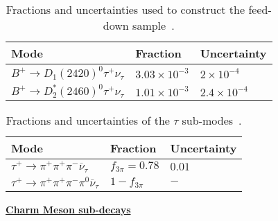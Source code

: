  
    
{
\renewcommand{\arraystretch}{1.25}
 \begin{table}
\centering
\scriptsize
\begin{tabular}{l | l | l }
Mode & Fraction & Uncertainty \\
\hline

$B^{+} \rightarrow D_{1}(2420)^{0} \tau^{+}\nu_{\tau}$ & $3.03\times10^{-3}$  & $2\times 10^{-4}$\\\hline
$B^{+} \rightarrow D_{2}^{*}(2460)^{0} \tau^{+}  \nu_{\tau}$  & $1.01 \times 10^{-3}$ &$2.4 \times 10^{-4}$\\

\end{tabular}
\caption{Fractions and uncertainties used to construct the feed-down sample~\cite{PhysRevD.98.030001}.}
\label{tab:Ds_bkg_modes}
\end{table}
    }
    
{
\renewcommand{\arraystretch}{1.25}
 \begin{table}
\centering
\scriptsize
\begin{tabular}{l | l | l }
Mode & Fraction & Uncertainty \\
\hline

$\tau^{+} \rightarrow \pi^{+} \pi^{+} \pi^{-} \overline{\nu}_{\tau}$ & $f_{3\pi}=0.78$  & $0.01$\\\hline
$\tau^{+} \rightarrow \pi^{+} \pi^{+} \pi^{-} \pi^{0} \overline{\nu}_{\tau}$  & $1-f_{3\pi}$ &$-$\\

\end{tabular}
\caption{Fractions and uncertainties of the $\tau$ sub-modes~\cite{PhysRevD.97.072013}.}
\label{tab:Ds_bkg_modes}
\end{table}
    }
    
    
    





\underline{\textbf{Charm Meson sub-decays}}
    
